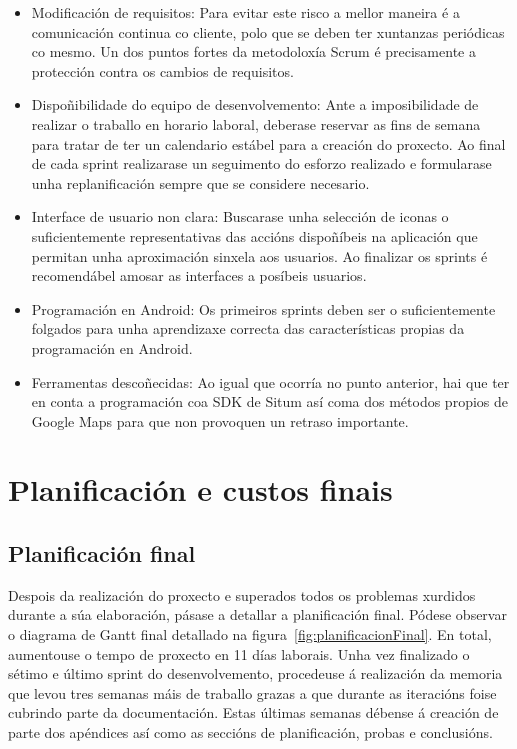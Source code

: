 \begin{itemize}
	\item Modificación de requisitos: Para evitar este risco a mellor maneira é a comunicación continua co cliente, polo que se deben ter xuntanzas periódicas co mesmo. Un dos puntos fortes da metodoloxía Scrum é precisamente a protección contra os cambios de requisitos.
	\item Dispoñibilidade do equipo de desenvolvemento: Ante a imposibilidade de realizar o traballo en horario laboral, deberase reservar as fins de semana para tratar de ter un calendario estábel para a creación do proxecto. Ao final de cada sprint realizarase un seguimento do esforzo realizado e formularase unha replanificación sempre que se considere necesario.
	\item Interface de usuario non clara: Buscarase unha selección de iconas o suficientemente representativas das accións dispoñíbeis na aplicación que permitan unha aproximación sinxela aos usuarios. Ao finalizar os sprints é recomendábel amosar as interfaces a posíbeis usuarios.
	\item Programación en Android: Os primeiros sprints deben ser o suficientemente folgados para unha aprendizaxe correcta das características propias da programación en Android.
	\item Ferramentas descoñecidas: Ao igual que ocorría no punto anterior, hai que ter en conta a programación coa SDK de Situm así coma dos métodos propios de Google Maps para que non provoquen un retraso importante.
\end{itemize}

\section{Planificación e custos finais}

\subsection{Planificación final}
Despois da realización do proxecto e superados todos os problemas xurdidos durante a súa elaboración, pásase a detallar a planificación final. Pódese observar o diagrama de Gantt final detallado na figura~\ref{fig:planificacionFinal}. En total, aumentouse o tempo de proxecto en 11 días laborais.
Unha vez finalizado o sétimo e último sprint do desenvolvemento, procedeuse á realización da memoria que levou tres semanas máis de traballo grazas a que durante as iteracións foise cubrindo parte da documentación. Estas últimas semanas débense á creación de parte dos apéndices así como as seccións de planificación, probas e conclusións.

